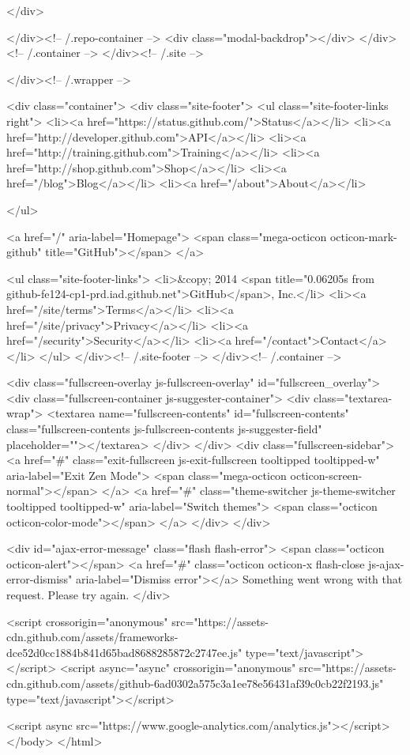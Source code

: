         </div>

      </div><!-- /.repo-container -->
      <div class="modal-backdrop"></div>
    </div><!-- /.container -->
  </div><!-- /.site -->


    </div><!-- /.wrapper -->

      <div class="container">
  <div class="site-footer">
    <ul class="site-footer-links right">
      <li><a href="https://status.github.com/">Status</a></li>
      <li><a href="http://developer.github.com">API</a></li>
      <li><a href="http://training.github.com">Training</a></li>
      <li><a href="http://shop.github.com">Shop</a></li>
      <li><a href="/blog">Blog</a></li>
      <li><a href="/about">About</a></li>

    </ul>

    <a href="/" aria-label="Homepage">
      <span class="mega-octicon octicon-mark-github" title="GitHub"></span>
    </a>

    <ul class="site-footer-links">
      <li>&copy; 2014 <span title="0.06205s from github-fe124-cp1-prd.iad.github.net">GitHub</span>, Inc.</li>
        <li><a href="/site/terms">Terms</a></li>
        <li><a href="/site/privacy">Privacy</a></li>
        <li><a href="/security">Security</a></li>
        <li><a href="/contact">Contact</a></li>
    </ul>
  </div><!-- /.site-footer -->
</div><!-- /.container -->


    <div class="fullscreen-overlay js-fullscreen-overlay" id="fullscreen_overlay">
  <div class="fullscreen-container js-suggester-container">
    <div class="textarea-wrap">
      <textarea name="fullscreen-contents" id="fullscreen-contents" class="fullscreen-contents js-fullscreen-contents js-suggester-field" placeholder=""></textarea>
    </div>
  </div>
  <div class="fullscreen-sidebar">
    <a href="#" class="exit-fullscreen js-exit-fullscreen tooltipped tooltipped-w" aria-label="Exit Zen Mode">
      <span class="mega-octicon octicon-screen-normal"></span>
    </a>
    <a href="#" class="theme-switcher js-theme-switcher tooltipped tooltipped-w"
      aria-label="Switch themes">
      <span class="octicon octicon-color-mode"></span>
    </a>
  </div>
</div>



    <div id="ajax-error-message" class="flash flash-error">
      <span class="octicon octicon-alert"></span>
      <a href="#" class="octicon octicon-x flash-close js-ajax-error-dismiss" aria-label="Dismiss error"></a>
      Something went wrong with that request. Please try again.
    </div>


      <script crossorigin="anonymous" src="https://assets-cdn.github.com/assets/frameworks-dce52d0cc1884b841d65bad8688285872c2747ee.js" type="text/javascript"></script>
      <script async="async" crossorigin="anonymous" src="https://assets-cdn.github.com/assets/github-6ad0302a575c3a1ee78e56431af39c0cb22f2193.js" type="text/javascript"></script>
      
      
        <script async src="https://www.google-analytics.com/analytics.js"></script>
  </body>
</html>

